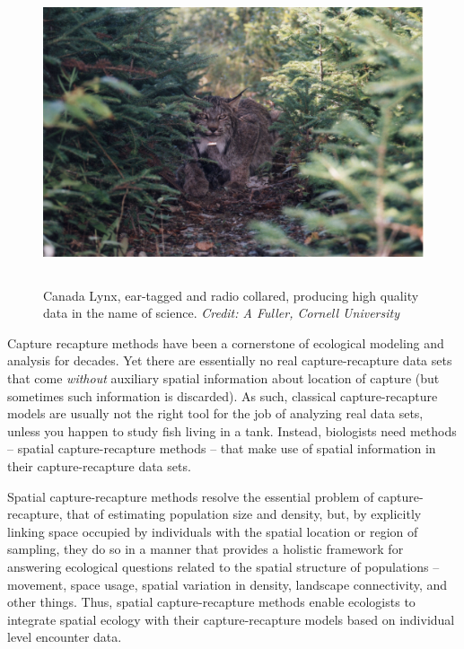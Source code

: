 \begin{figure}[h!]
\centering
\includegraphics[height=3.5in]{Ch20-Last/lynx.jpg}
\caption{
Canada Lynx, ear-tagged and radio collared, producing high quality
data in the name of science.
{\it Credit: A Fuller, Cornell University}  }
\label{last.fig.lynx}
\end{figure}


Capture recapture methods have been a cornerstone of ecological
modeling and analysis for decades.  Yet there are essentially no real
capture-recapture data sets that come {\it without} auxiliary spatial
information about location of capture (but sometimes such information
is discarded).  As such, classical capture-recapture
models are usually not the right tool for the job of analyzing real
data sets, unless you happen to study fish living in a tank.
Instead, biologists need methods -- spatial
capture-recapture methods -- that make use of spatial
information in their capture-recapture data sets.


Spatial capture-recapture methods resolve the essential problem of
capture-recapture, that of estimating population size and density,
but, by explicitly linking space occupied by individuals with the
spatial location or region of sampling, they do so in a manner that
provides a holistic framework for answering ecological questions
related to the spatial structure of populations -- movement, space
usage, spatial variation in density, landscape connectivity, and other
things.  Thus, spatial capture-recapture methods enable ecologists to
integrate spatial ecology
with their capture-recapture models based on
individual level encounter data.

